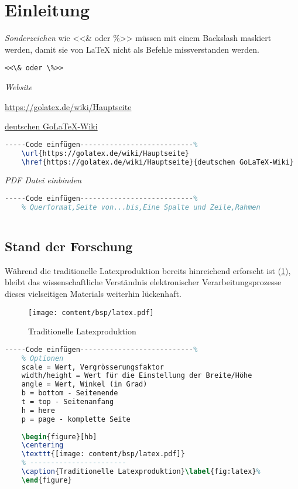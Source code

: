 \clearpage
\section*{Einleitung}

\emph{Sonderzeichen}  wie <<\& oder \%>> müssen mit einem Backslash maskiert werden, damit sie von LaTeX nicht als Befehle missverstanden werden.

\verb|<<\& oder \%>>| 

\emph{Website}

\url{https://golatex.de/wiki/Hauptseite} 

\href{https://golatex.de/wiki/Hauptseite}{deutschen GoLaTeX-Wiki}
\begin{lstlisting}[language=TeX,% C, TeX, Bash, Python
]-----Code einfügen---------------------------%
	\url{https://golatex.de/wiki/Hauptseite}
	\href{https://golatex.de/wiki/Hauptseite}{deutschen GoLaTeX-Wiki}
\end{lstlisting} 

\emph{PDF Datei einbinden}
\begin{lstlisting}[language=TeX,% C, TeX, Bash, Python
]-----Code einfügen---------------------------%
	% Querformat,Seite von...bis,Eine Spalte und Zeile,Rahmen
	
\end{lstlisting}



\clearpage
\subsection*{Stand der Forschung}

Während die traditionelle Latexproduktion bereits hinreichend erforscht ist (\ref{fig:latex}), bleibt das wissenschaftliche Verständnis elektronischer Verarbeitungsprozesse dieses vielseitigen Materials weiterhin lückenhaft. 


\begin{figure}[hb]
	\centering
	\texttt{[image: content/bsp/latex.pdf]}
	\caption{Traditionelle Latexproduktion}\label{fig:latex}%
\end{figure}


\begin{lstlisting}[language=TeX,% C, TeX, Bash, Python
]-----Code einfügen---------------------------%
	% Optionen
	scale = Wert, Vergrösserungsfaktor
	width/height = Wert für die Einstellung der Breite/Höhe
	angle = Wert, Winkel (in Grad)
	b = bottom - Seitenende 
	t = top - Seitenanfang
	h = here
	p = page - komplette Seite  
	
	\begin{figure}[hb]
	\centering
	\texttt{[image: content/bsp/latex.pdf]}
	% -----------------------
	\caption{Traditionelle Latexproduktion}\label{fig:latex}%
	\end{figure}
\end{lstlisting}


